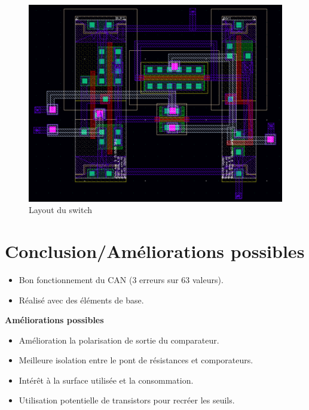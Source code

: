 \documentclass{beamer}
\begin{document}
\begin{frame}

\begin{figure}[!htb]
  \includegraphics[width=0.6\linewidth]{layout_.png}
  \caption{Layout du switch}
\end{figure}

\end{frame}


\section{Conclusion/Am\'eliorations possibles}

\begin{frame}

\begin{itemize}
    \item Bon fonctionnement du CAN (3 erreurs sur 63 valeurs).
    \item R\'ealis\'e avec des \'el\'ements de base.
\end{itemize}

\medskip

\textbf{Am\'eliorations possibles}
\begin{itemize}
  \item Am\'elioration la polarisation de sortie du comparateur.
  \item Meilleure isolation entre le pont de r\'esistances et comporateurs.
  \item Int\'er\^et \`a la surface utilis\'ee et la consommation.
  \item Utilisation potentielle de transistors pour recr\'eer les seuils.
\end{itemize}


\end{frame}

\end{document}
